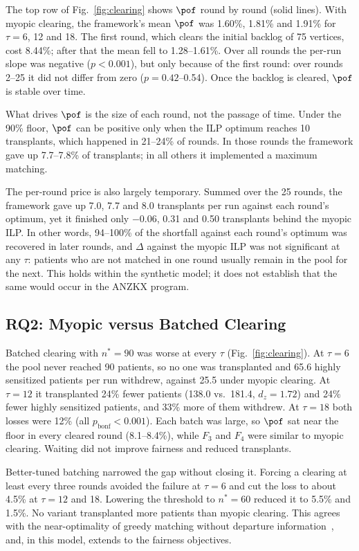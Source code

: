 \documentclass[journal]{IEEEtran}
\begin{document}
The top row of Fig.~\ref{fig:clearing} shows $\pof$ round by round (solid lines). With myopic clearing,
the framework's mean $\pof$ was 1.60\%, 1.81\% and 1.91\% for
$\tau = 6$, 12 and 18. The first round, which clears the initial
backlog of 75 vertices, cost 8.44\%; after that the mean fell to
1.28--1.61\%. Over all rounds the per-run slope was negative
($p < 0.001$), but only because of the first round: over rounds 2--25
it did not differ from zero ($p = 0.42$--0.54). Once the backlog is
cleared, $\pof$ is stable over time.

What drives $\pof$ is the size of each round, not the passage of
time. Under the 90\% floor, $\pof$ can be positive only when the ILP
optimum reaches 10 transplants, which happened in 21--24\% of rounds.
In those rounds the framework gave up 7.7--7.8\% of transplants; in
all others it implemented a maximum matching.

The per-round price is also largely temporary. Summed over
the 25 rounds, the framework gave up 7.0, 7.7 and 8.0 transplants per
run against each round's optimum, yet it finished only $-0.06$, 0.31
and 0.50 transplants behind the myopic ILP. In other words,
94--100\% of the shortfall against each round's optimum was recovered
in later rounds, and $\Delta$ against the myopic ILP was not
significant at any $\tau$: patients who are not matched in one round
usually remain in the pool for the next. This holds within the synthetic
model; it does not establish that the same would occur in the ANZKX
program.

\subsection{RQ2: Myopic versus Batched Clearing}
\label{sec:results:rq2}

Batched clearing with $n^* = 90$ was worse at every $\tau$
(Fig.~\ref{fig:clearing}). At $\tau = 6$ the pool never reached 90
patients, so no one was transplanted and 65.6 highly sensitized
patients per run withdrew, against 25.5 under myopic clearing. At
$\tau = 12$ it transplanted 24\% fewer patients (138.0 vs.\ 181.4,
$d_z = 1.72$) and 24\% fewer highly sensitized patients, and 33\% more
of them withdrew. At $\tau = 18$ both losses were 12\% (all
$p_{\mathrm{bonf}} < 0.001$). Each batch was large, so $\pof$ sat near
the floor in every cleared round (8.1--8.4\%), while $F_3$ and $F_4$
were similar to myopic clearing. Waiting did not improve fairness and reduced transplants.

Better-tuned batching narrowed the gap without closing it. Forcing a clearing at least every three
rounds avoided the failure at $\tau = 6$ and cut the loss to about
4.5\% at $\tau = 12$ and 18. Lowering the threshold to $n^* = 60$
reduced it to 5.5\% and 1.5\%. No variant transplanted more patients
than myopic clearing. This agrees with the near-optimality of greedy
matching without departure information~\cite{anderson2017efficient,akbarpour2020thickness}, and, in this model, extends to the fairness
objectives.
\end{document}
